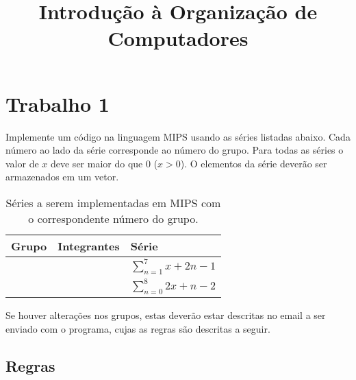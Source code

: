 \documentclass[12pt,a4paper]{article}
\newcounter{serieno}\setcounter{serieno}{0}
\def\sno{\addtocounter{serieno}{1}\arabic{serieno}}
\begin{document}
\small

\title{Introdução à Organização de Computadores}
\author{}
\maketitle

\section*{Trabalho 1}

Implemente um código na linguagem MIPS usando as séries listadas
abaixo. Cada número ao lado da série corresponde ao número do
grupo. Para todas as séries o valor de $x$ deve ser maior do que $0$
($x>0$).  O elementos da série deverão ser armazenados em um vetor.

\begin{table}[ht]
  \centering
  \large
  \begin{tabular}[ht]{|l|l|l|}\hline
    \bf Grupo & Integrantes & Série \\\hline\hline
    \sno & & $\sum_{n=1}^{7}x+2n-1$\\\hline
    \sno &  &$\sum_{n=0}^{8}2x+n-2$\\\hline
  \end{tabular}
\label{tab:series}%
\caption{Séries a serem implementadas em MIPS com o correspondente número do grupo.}
\end{table}

Se houver alterações nos grupos, estas deverão estar descritas no
email a ser enviado com o programa, cujas as regras são descritas a
seguir.

\subsection*{Regras}
\end{document}
